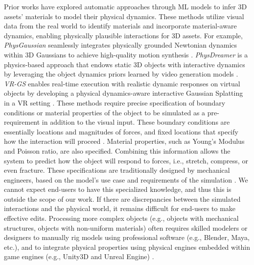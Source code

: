 Prior works have explored automatic approaches through ML models to infer 3D assets' materials to model their physical dynamics. 
These methods utilize visual data from the real world to identify materials and incorporate material-aware dynamics, enabling physically plausible interactions for 3D assets.
For example, \textit{PhysGaussian} seamlessly integrates physically grounded Newtonian dynamics within 3D Gaussians to achieve high-quality motion synthesis \cite{xie2024physgaussian}.
\textit{PhysDreamer} is a physics-based approach that endows static 3D objects with interactive dynamics by leveraging the object dynamics priors learned by video generation models \cite{zhang2024physdreamer}.
\textit{VR-GS} enables real-time execution with realistic dynamic responses on virtual objects by developing a physical dynamics-aware interactive Gaussian Splatting in a VR setting \cite{10.1145/3641519.3657448}.
These methods require precise specification of boundary conditions or material properties of the object to be simulated as a pre-requirement in addition to the visual input. 
These boundary conditions are essentially locations and magnitudes of forces, and fixed locations that specify how the interaction will proceed \cite{zhang2024physdreamer,
xie2024physgaussian,li2023pacnerfphysicsaugmentedcontinuum}. 
Material properties, such as Young's Modulus and Poisson ratio, are also specified.
Combining this information allows the system to predict how the object will respond to forces, i.e., stretch, compress, or even fracture. 
These specifications are traditionally designed by mechanical engineers, based on the model's use case and requirements of the simulation \cite{xie2024physgaussian,zhang2024physdreamer}. 
We cannot expect end-users to have this specialized knowledge, and thus this is outside the scope of our work.
If there are discrepancies between the simulated interactions and the physical world, it remains difficult for end-users to make effective edits.
Processing more complex objects (e.g., objects with mechanical structures, objects with non-uniform materials) often requires skilled modelers or designers to manually rig models using professional software (e.g., Blender, Maya, etc.), and to integrate physical properties using physical engines embedded within game engines (e.g., Unity3D and Unreal Engine) \cite{millington2010game}.

